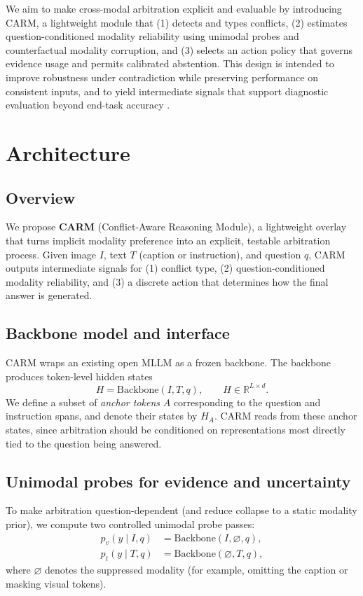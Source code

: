 \documentclass{article}
\begin{document}
We aim to make cross-modal arbitration explicit and evaluable by introducing CARM, a lightweight module that (1) detects and types conflicts, (2) estimates question-conditioned modality reliability using unimodal probes and counterfactual modality corruption, and (3) selects an action policy that governs evidence usage and permits calibrated abstention. This design is intended to improve robustness under contradiction while preserving performance on consistent inputs, and to yield intermediate signals that support diagnostic evaluation beyond end-task accuracy \citep{popordanoska_clash_2025, zhang_evaluating_2025, zhang_instruction_2026, wen_know_2025}.


\section{Architecture}
\label{sec:architecture}

\subsection{Overview}
We propose \textbf{CARM} (Conflict-Aware Reasoning Module), a lightweight overlay that turns implicit modality preference into an explicit, testable arbitration process. Given image $I$, text $T$ (caption or instruction), and question $q$, CARM outputs intermediate signals for (1) conflict type, (2) question-conditioned modality reliability, and (3) a discrete action that determines how the final answer is generated.

\subsection{Backbone model and interface}
CARM wraps an existing open MLLM as a frozen backbone. The backbone produces token-level hidden states
\[
H = \mathrm{Backbone}(I, T, q), \qquad H \in \mathbb{R}^{L \times d}.
\]
We define a subset of \emph{anchor tokens} $A$ corresponding to the question and instruction spans, and denote their states by $H_A$. CARM reads from these anchor states, since arbitration should be conditioned on representations most directly tied to the question being answered.

\subsection{Unimodal probes for evidence and uncertainty}
To make arbitration question-dependent (and reduce collapse to a static modality prior), we compute two controlled unimodal probe passes:
\begin{align}
p_v(y \mid I, q) &= \mathrm{Backbone}(I, \varnothing, q), \\
p_t(y \mid T, q) &= \mathrm{Backbone}(\varnothing, T, q),
\end{align}
where $\varnothing$ denotes the suppressed modality (for example, omitting the caption or masking visual tokens).
\end{document}
